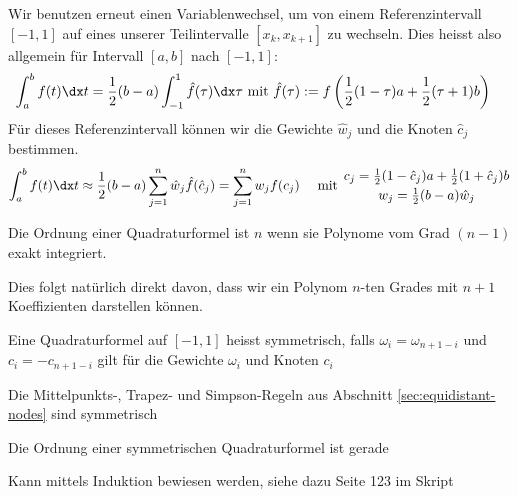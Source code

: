 Wir benutzen erneut einen Variablenwechsel, um von einem Referenzintervall $[-1, 1]$ auf eines unserer Teilintervalle $[x_k, x_{k + 1}]$ zu wechseln.
Dies heisst also allgemein für Intervall $[a, b]$ nach $[-1, 1]$:
\begin{align*}
    \int_{a}^{b} f(t) \dx t = \frac{1}{2} (b - a) \int_{-1}^{1} \hat{f}(\tau) \dx \tau & \text{ mit } \hat{f}(\tau) := f\left( \frac{1}{2}(1 - \tau) a + \frac{1}{2}(\tau + 1) b \right)
\end{align*}
Für dieses Referenzintervall können wir die Gewichte $\hat{w}_j$ und die Knoten $\hat{c}_j$ bestimmen.
\rmvspace
\begin{align*}
    \int_{a}^{b} f(t) \dx t \approx \frac{1}{2}(b - a) \sum_{j = 1}^{n} \hat{w}_j \hat{f}(\hat{c}_j) = \sum_{j = 1}^{n} w_j f(c_j)
     &  & \text{ mit } {c_j = \frac{1}{2} (1 - \hat{c}_j) a + \frac{1}{2}(1 + \hat{c}_j) b \atop{w_j = \frac{1}{2}(b - a)\hat{w}_j}}
\end{align*}

\rmvspace\rmvspace
\inlinedef Die Ordnung einer Quadraturformel ist $n$ wenn sie Polynome vom Grad $(n - 1)$ exakt integriert.

Dies folgt natürlich direkt davon, dass wir ein Polynom $n$-ten Grades mit $n + 1$ Koeffizienten darstellen können.

 Eine Quadraturformel auf $[-1, 1]$ heisst symmetrisch, falls $\omega_i = \omega_{n + 1 - i}$ und \\
$c_i = -c_{n + 1 -i}$ gilt für die Gewichte $\omega_i$ und Knoten $c_i$

\inlineremark Die Mittelpunkts-, Trapez- und Simpson-Regeln aus Abschnitt \ref{sec:equidistant-nodes} sind symmetrisch

\inlinetheorem Die Ordnung einer symmetrischen Quadraturformel ist gerade

\inlineproof Kann mittels Induktion bewiesen werden, siehe dazu Seite 123 im Skript
